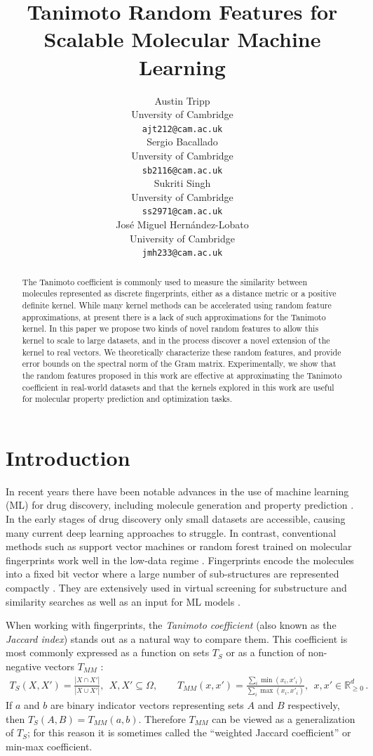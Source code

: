 \documentclass{article}
\title{Tanimoto Random Features for Scalable Molecular Machine Learning}
\author{%
  Austin Tripp \\
  Unversity of Cambridge \\
  \texttt{ajt212@cam.ac.uk} \\
  \And
  Sergio Bacallado \\
  Unversity of Cambridge \\
  \texttt{sb2116@cam.ac.uk} \\
  \AND
  Sukriti Singh \\
  Unversity of Cambridge \\
  \texttt{ss2971@cam.ac.uk} \\
  \And
  José Miguel Hernández-Lobato \\
  University of Cambridge \\
  \texttt{jmh233@cam.ac.uk} \\
}
\theoremstyle{plain}
\theoremstyle{definition}
\theoremstyle{remark}
\newcommand{\numeq}[1]{\begin{align}#1\end{align}}
\begin{document}
\maketitle


\begin{abstract}
The Tanimoto coefficient is commonly used to measure the similarity between molecules
represented as discrete fingerprints,
either as a distance metric or a positive definite kernel.
While many kernel methods can be accelerated using random feature approximations,
at present there is a lack of such approximations for the Tanimoto kernel.
In this paper we propose two kinds of novel random features to allow this kernel to scale to large datasets,
and in the process discover a novel extension of the kernel to real vectors.
We theoretically characterize these random features, and provide error bounds on the spectral norm of the Gram matrix.
Experimentally, we show that the random features proposed in this work are effective at
approximating the Tanimoto coefficient in real-world datasets
and that the kernels explored in this work are useful for molecular property prediction and optimization tasks.
\end{abstract}


\section{Introduction}

In recent years there have been notable advances in the use of machine learning (ML) for drug discovery, including molecule generation and property prediction \citep{dara2022machine}. In the early stages of drug discovery only small datasets are accessible, causing many current deep learning approaches to struggle.
In contrast, conventional methods such as support vector machines or random forest trained on molecular fingerprints work well in the low-data regime \citep{walters2020applications, stanley2021fs}.  Fingerprints encode the molecules into a fixed bit vector where a large number of sub-structures are represented compactly \citep{david2020molecular}. They are extensively used in virtual screening for substructure and similarity searches as well as an input for ML models \citep{cereto2015molecular, granda2018controlling}.


When working with fingerprints, the \emph{Tanimoto coefficient}
(also known as the \emph{Jaccard index})
stands out as a natural way to compare them.
This coefficient is most commonly expressed as a function on sets $T_S$
or as a function of non-negative vectors $T_{MM}$
\citep{jaccard1912distribution,tanimoto1958elementary,ralaivola2005graph,costa2021further,tan2016introduction}:
\numeq{
\label{eqn:tanimoto-for-sets}
    T_S(X, X') = \frac{|X\cap X'|}{|X\cup X'|},~~ X,X'\subseteq \Omega, \qquad
    T_{MM}(x, x') = \frac{\sum_i \min(x_i, x'_i)}{\sum_i \max(x_i, x'_i)},~~ x,x'\in\mathbb{R}^d_{\geq0} \,.
}
If $a$ and $b$ are binary indicator vectors representing sets $A$ and $B$
respectively,
then $T_S(A,B)=T_{MM}(a,b)$.
Therefore $T_{MM}$ can be viewed as a generalization of $T_S$;
for this reason it is sometimes called the ``weighted Jaccard coefficient''
or min-max coefficient.
\end{document}
